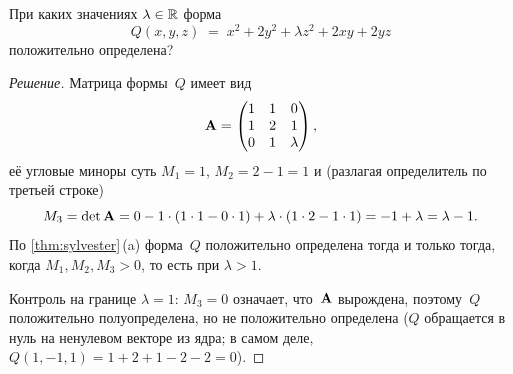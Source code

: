 \begin{problem}
\label{prob:sylvester-parameter}
При каких значениях $\lambda \in \mathbb{R}$ форма
\[
  Q(x, y, z) \;=\; x^2 + 2y^2 + \lambda z^2 + 2xy + 2yz
\]
положительно определена?
\end{problem}

\begin{proof}[Решение]
Матрица формы~$Q$ имеет вид
\[
  \mathbf{A} = \begin{pmatrix} 1 & 1 & 0 \\ 1 & 2 & 1 \\ 0 & 1 & \lambda \end{pmatrix},
\]
её угловые миноры суть $M_1 = 1$, $M_2 = 2 - 1 = 1$ и (разлагая
определитель по третьей строке)
\[
  M_3 = \det \mathbf{A} = 0 - 1 \cdot (1 \cdot 1 - 0 \cdot 1) + \lambda \cdot (1 \cdot 2 - 1 \cdot 1)
      = -1 + \lambda = \lambda - 1.
\]
По \cref{thm:sylvester}\,(a) форма~$Q$ положительно определена тогда и
только тогда, когда $M_1, M_2, M_3 > 0$, то есть при $\lambda > 1$.

Контроль на границе $\lambda = 1$: $M_3 = 0$ означает, что~$\mathbf{A}$
вырождена, поэтому~$Q$ положительно полуопределена, но не положительно
определена ($Q$ обращается в нуль на ненулевом векторе из ядра; в
самом деле, $Q(1, -1, 1) = 1 + 2 + 1 - 2 - 2 = 0$).
\end{proof}
